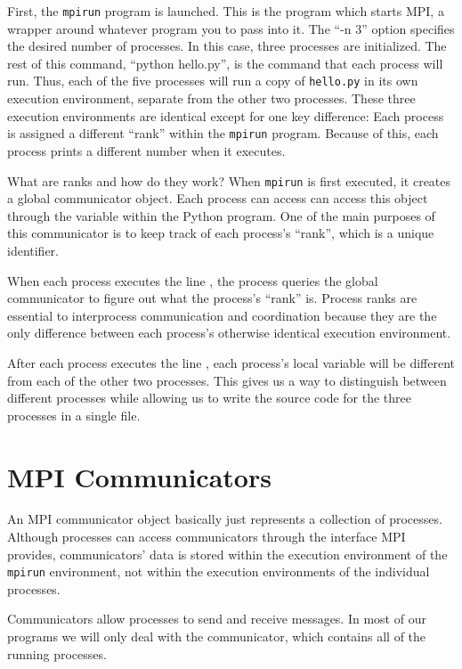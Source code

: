 First, the \texttt{mpirun} program is launched. This is the program which starts
MPI, a wrapper around whatever program you to pass into it. The ``-n 3'' option
specifies the desired number of processes. In this case, three processes are
initialized. The rest of this command, ``python hello.py'', is the command that
each process will run. Thus, each of the five processes will run a copy of
\texttt{hello.py} in its own execution environment, separate from the other two
processes. These three execution environments are identical except for one key
difference: Each process is assigned a different ``rank'' within the
\texttt{mpirun} program. Because of this, each process prints a different number
when it executes.

What are ranks and how do they work? When \texttt{mpirun} is first executed, it
creates a global communicator object. Each process can access can access this
object through the variable  within the Python program. One
of the main purposes of this communicator is to keep track of each process's
``rank'', which is a unique identifier.

When each process executes the line , the process
queries the global communicator to figure out what the process's ``rank'' is.
Process ranks are essential to interprocess communication and coordination
because they are the only difference between each process's otherwise identical
execution environment.

After each process executes the line , each process's
local variable  will be different from each of the other two processes.
This gives us a way to distinguish between different processes while allowing us
to write the source code for the three processes in a single file.

\section*{MPI Communicators}
An MPI communicator object basically just represents a collection of processes.
Although processes can access communicators through the interface MPI provides,
communicators' data is stored within the execution environment of the
\texttt{mpirun} environment, not within the execution environments of the
individual processes.

Communicators allow processes to send and receive messages. In most of our
programs we will only deal with the  communicator, which
contains all of the running processes.

